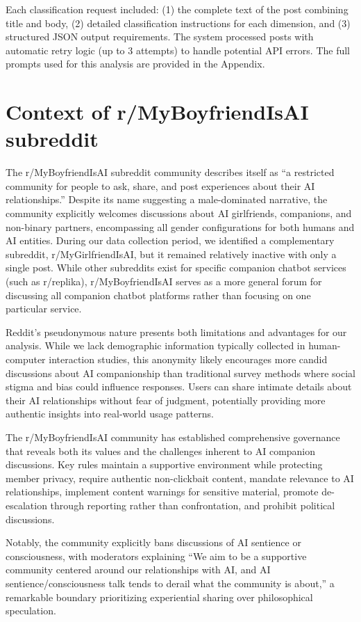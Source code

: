 \documentclass[sigconf, nonacm]{acmart}
\begin{document}
Each classification request included: (1) the complete text of the post combining title and body, (2) detailed classification instructions for each dimension, and (3) structured JSON output requirements. The system processed posts with automatic retry logic (up to 3 attempts) to handle potential API errors. The full prompts used for this analysis are provided in the Appendix.

\section{Context of r/MyBoyfriendIsAI subreddit}
The r/MyBoyfriendIsAI subreddit community describes itself as ``a restricted community for people to ask, share, and post experiences about their AI relationships.'' Despite its name suggesting a male-dominated narrative, the community explicitly welcomes discussions about AI girlfriends, companions, and non-binary partners, encompassing all gender configurations for both humans and AI entities. During our data collection period, we identified a complementary subreddit, r/MyGirlfriendIsAI, but it remained relatively inactive with only a single post. While other subreddits exist for specific companion chatbot services (such as r/replika), r/MyBoyfriendIsAI serves as a more general forum for discussing all companion chatbot platforms rather than focusing on one particular service.

Reddit's pseudonymous nature presents both limitations and advantages for our analysis. While we lack demographic information typically collected in human-computer interaction studies, this anonymity likely encourages more candid discussions about AI companionship than traditional survey methods where social stigma and bias could influence responses. Users can share intimate details about their AI relationships without fear of judgment, potentially providing more authentic insights into real-world usage patterns.

The r/MyBoyfriendIsAI community has established comprehensive governance that reveals both its values and the challenges inherent to AI companion discussions. Key rules maintain a supportive environment while protecting member privacy, require authentic non-clickbait content, mandate relevance to AI relationships, implement content warnings for sensitive material, promote de-escalation through reporting rather than confrontation, and prohibit political discussions. 

Notably, the community explicitly bans discussions of AI sentience or consciousness, with moderators explaining ``We aim to be a supportive community centered around our relationships with AI, and AI sentience/consciousness talk tends to derail what the community is about,'' a remarkable boundary prioritizing experiential sharing over philosophical speculation. 
\end{document}
